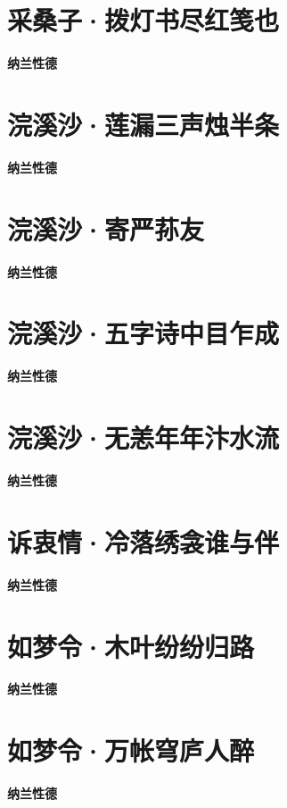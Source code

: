 \documentclass[12pt,a4paper]{ctexbook}
\begin{document}
\section{采桑子·拨灯书尽红笺也}
\textbf{纳兰性德}\par\vspace{0.5em}

\section{浣溪沙·莲漏三声烛半条}
\textbf{纳兰性德}\par\vspace{0.5em}

\section{浣溪沙·寄严荪友}
\textbf{纳兰性德}\par\vspace{0.5em}

\section{浣溪沙·五字诗中目乍成}
\textbf{纳兰性德}\par\vspace{0.5em}

\section{浣溪沙·无恙年年汴水流}
\textbf{纳兰性德}\par\vspace{0.5em}

\section{诉衷情·冷落绣衾谁与伴}
\textbf{纳兰性德}\par\vspace{0.5em}

\section{如梦令·木叶纷纷归路}
\textbf{纳兰性德}\par\vspace{0.5em}

\section{如梦令·万帐穹庐人醉}
\textbf{纳兰性德}\par\vspace{0.5em}
\end{document}
